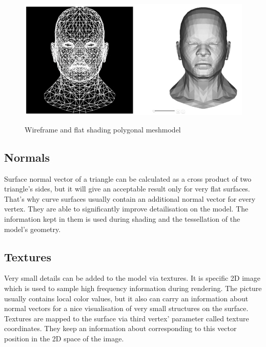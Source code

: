 \documentclass[twoside, english, 11pt]{report}
\begin{document}
\begin{figure}[H]
\includegraphics[scale=0.55]{img/mesh}\\
\caption{Wireframe and flat shading polygonal meshmodel}
\end{figure}

\subsection{Normals}
Surface normal vector of a triangle can be calculated as a cross product of two triangle's sides, but it will give an acceptable result only for very flat surfaces. That's why curve surfaces usually contain an additional normal vector for every vertex. They are able to significantly improve detailisation on the model. The information kept in them is used during shading and the tessellation of the model's geometry.\\


\subsection{Textures}
Very small details can be added to the model via textures. It is specific 2D image which is used to sample high frequency information during rendering. The picture usually contains local color values, but it also can carry an information about normal vectors for a nice visualisation of very small structures on the surface. Textures are mapped to the surface via third vertex' parameter called texture coordinates. They keep an information about corresponding to this vector position in the 2D space of the image.\\

\end{document}
